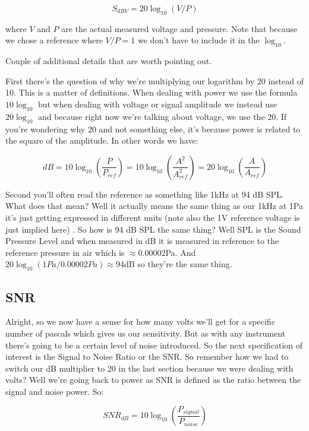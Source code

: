 \documentclass[10pt,a5paper]{book}
\begin{document}
\begin{equation}
S_{dBV} = 20 \log_{10}(V/P)
\end{equation}

where $V$ and $P$ are the actual measured voltage and pressure. Note that because we chose a reference where $V/P=1$ we don't have to include it in the $\log_{10}$. 

Couple of additional details that are worth pointing out. 

First there's the question of why we're multiplying our logarithm by 20 instead of 10. This is a matter of definitions. When dealing with power we use the formula $10 \log_{10}$ but when dealing with voltage or signal amplitude we instead use $20 \log_{10}$ and because right now we're talking about voltage, we use the 20. If you're wondering why 20 and not something else, it's because power is related to the square of the amplitude. In other words we have:

\begin{equation}
dB = 10 \log_{10}(\frac{P}{P_{ref}})=10 \log_{10}(\frac{A^2}{A^2_{ref}})=20 \log_{10} (\frac{A}{A_{ref}})
\end{equation}

Second you'll often read the reference as something like 1kHz at 94 dB SPL. What does that mean? Well it actually means the same thing as our 1kHz at 1Pa it's just getting expressed in different units (note also the 1V reference voltage is just implied here) \cite{rdunn}. So how is 94 dB SPL the same thing? Well SPL is the Sound Pressure Level and when measured in dB it is measured in reference to the reference pressure in air which is $\approx 0.00002$Pa. And $20 \log_{10}(1Pa/0.00002Pa)\approx 94$dB so they're the same thing. 

\subsection{SNR}
Alright, so we now have a sense for how many volts we'll get for a specific number of pascals which gives us our sensitivity. But as with any instrument there's going to be a certain level of noise introduced. So the next specification of interest is the Signal to Noise Ratio or the SNR. So remember how we had to switch our dB multiplier to 20 in the last section because we were dealing with volts? Well we're going back to power as SNR is defined as the ratio between the signal and noise power. So:

\begin{equation}
SNR_{dB}=10 \log_{10}(\frac{P_{signal}}{P_{noise}})
\end{equation}
\end{document}
